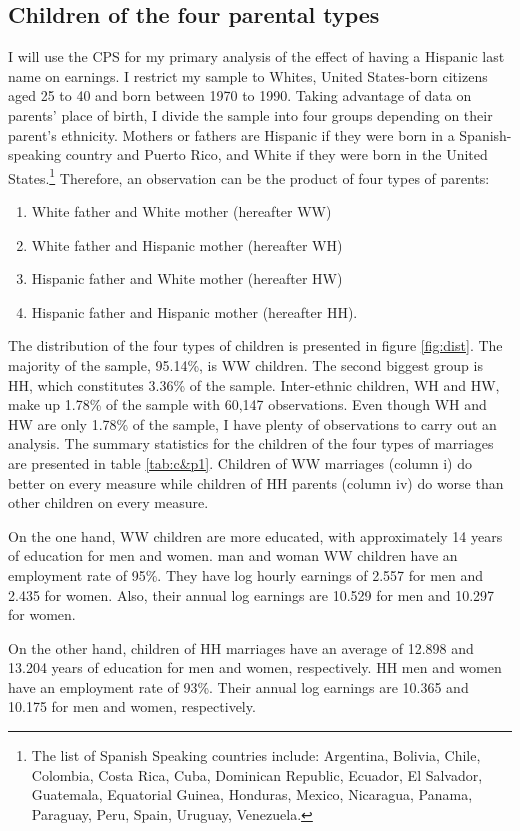 \documentclass{wptemp}
\begin{document}
\subsection{Children of the four parental types}
I will use the CPS for my primary analysis of the effect of having a Hispanic last name on earnings. I restrict my sample to Whites, United States-born citizens aged 25 to 40 and born between 1970 to 1990. Taking advantage of data on parents' place of birth, I divide the sample into four groups depending on their parent's ethnicity. Mothers or fathers are Hispanic if they were born in a Spanish-speaking country and Puerto Rico, and White if they were born in the United States.\footnote{The list of Spanish Speaking countries include: Argentina, Bolivia, Chile, Colombia, Costa Rica, Cuba, Dominican Republic, Ecuador, El Salvador, Guatemala, Equatorial Guinea, Honduras, Mexico, Nicaragua, Panama, Paraguay, Peru, Spain, Uruguay, Venezuela.} Therefore, an observation can be the product of four types of parents: 
\begin{enumerate}
\item White father and White mother (hereafter WW) 
\item White father and Hispanic mother (hereafter WH)
\item Hispanic father and White mother (hereafter HW)
\item Hispanic father and Hispanic mother (hereafter HH).
\end{enumerate}
The distribution of the four types of children is presented in figure \ref{fig:dist}. The majority of the sample, 95.14\%, is WW children. The second biggest group is HH, which constitutes 3.36\% of the sample. Inter-ethnic children, WH and HW, make up 1.78\% of the sample with 60,147 observations. Even though WH and HW are only 1.78\% of the sample, I have plenty of observations to carry out an analysis. The summary statistics for the children of the four types of marriages are presented in table \ref{tab:c&p1}. Children of WW marriages (column i) do better on every measure while children of HH parents (column iv) do worse than other children on every measure. 


On the one hand, WW children are more educated, with approximately 14 years of education for men and women. man and woman WW children have an employment rate of 95\%. They have log hourly earnings of 2.557 for men and 2.435 for women. Also, their annual log earnings are 10.529 for men and 10.297 for women.

On the other hand, children of HH marriages have an average of 12.898 and 13.204 years of education for men and women, respectively. HH men and women have an employment rate of 93\%. Their annual log earnings are 10.365 and 10.175 for men and women, respectively. 
\end{document}
